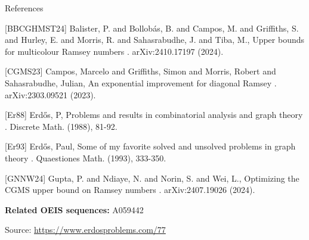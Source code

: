 \documentclass{article}
\begin{document}
References

[BBCGHMST24] Balister, P. and Bollob\'{a}s, B. and Campos, M. and Griffiths, S. and Hurley, E. and Morris, R. and Sahasrabudhe, J. and Tiba, M., Upper bounds for multicolour Ramsey numbers . arXiv:2410.17197 (2024).

[CGMS23] Campos, Marcelo and Griffiths, Simon and Morris, Robert and Sahasrabudhe, Julian, An exponential improvement for diagonal Ramsey . arXiv:2303.09521 (2023).

[Er88] Erd\H{o}s, P, Problems and results in combinatorial analysis and graph theory . Discrete Math. (1988), 81-92.

[Er93] Erd\H{o}s, Paul, Some of my favorite solved and unsolved problems in graph theory . Quaestiones Math. (1993), 333-350.

[GNNW24] Gupta, P. and Ndiaye, N. and Norin, S. and Wei, L., Optimizing the CGMS upper bound on Ramsey numbers . arXiv:2407.19026 (2024).

\noindent\textbf{Related OEIS sequences:} A059442


\bigskip
\noindent\small{Source: \url{https://www.erdosproblems.com/77}}
\end{document}
